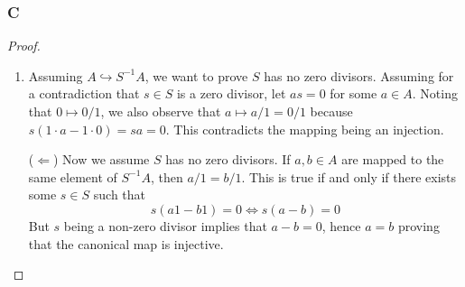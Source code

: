 \documentclass{article}
\begin{document}
\subsubsection{C}\label{1.3.C}
\begin{proof}
    \begin{enumerate}[($\Rightarrow$)]
        \item Assuming $A\hookrightarrow S^{-1}A$, we want to prove $S$ has no zero divisors. Assuming for a contradiction that $s\in S$ is a zero divisor, let $as=0$ for some $a\in A$. Noting that $0\mapsto 0/1$, we also observe that $a\mapsto a/1=0/1$ because $s(1\cdot a-1\cdot 0)=sa=0$. This contradicts the mapping being an injection.
        \item[($\Leftarrow$)]
        Now we assume $S$ has no zero divisors. If $a,b\in A$ are mapped to the same element of $S^{-1}A$, then $a/1=b/1$. This is true if and only if there exists some $s\in S$ such that
        \[
        s(a1-b1)=0\iff s(a-b)=0
        \]
        But $s$ being a non-zero divisor implies that $a-b=0$, hence $a=b$ proving that the canonical map is injective.
    \end{enumerate}
\end{proof}
\end{document}
